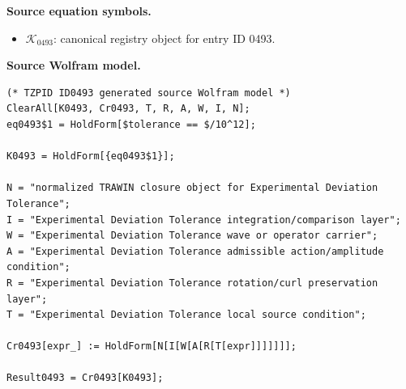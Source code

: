 \begin{minipage}[t]{0.49\linewidth}
\begingroup
\small
\raggedright
\textbf{Source equation symbols.}\par
\begin{itemize}[leftmargin=1.35em,itemsep=1pt,topsep=1pt,parsep=0pt]
    \item $\mathcal{K}_{0493}$: canonical registry object for entry ID 0493.
\end{itemize}
\endgroup
\end{minipage}\hfill
\begin{minipage}[t]{0.47\linewidth}
\begingroup
\scriptsize
\raggedright
\textbf{Source Wolfram model.}\par
\begin{Verbatim}[fontsize=\tiny,breaklines=true,breakanywhere=true]
(* TZPID ID0493 generated source Wolfram model *)
ClearAll[K0493, Cr0493, T, R, A, W, I, N];
eq0493$1 = HoldForm[$tolerance == $/10^12];

K0493 = HoldForm[{eq0493$1}];

N = "normalized TRAWIN closure object for Experimental Deviation Tolerance";
I = "Experimental Deviation Tolerance integration/comparison layer";
W = "Experimental Deviation Tolerance wave or operator carrier";
A = "Experimental Deviation Tolerance admissible action/amplitude condition";
R = "Experimental Deviation Tolerance rotation/curl preservation layer";
T = "Experimental Deviation Tolerance local source condition";

Cr0493[expr_] := HoldForm[N[I[W[A[R[T[expr]]]]]]];

Result0493 = Cr0493[K0493];
\end{Verbatim}
\endgroup
\end{minipage}

